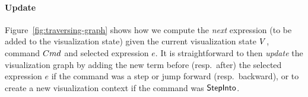 

\paragraph{Update}
%
Figure~\ref{fig:traversing-graph} shows
how we compute the \emph{next} expression
(to be added to the visualization state)
given the current visualization state
$V$, command $Cmd$ and selected
expression $e$.
%
It is straightforward to then \emph{update}
the visualization graph by adding the new
term before (resp.\ after) the selected
expression $e$ if the command was a step
or jump forward (resp.\ backward), or
to create a new visualization context
if the command was $\mathsf{StepInto}$.


